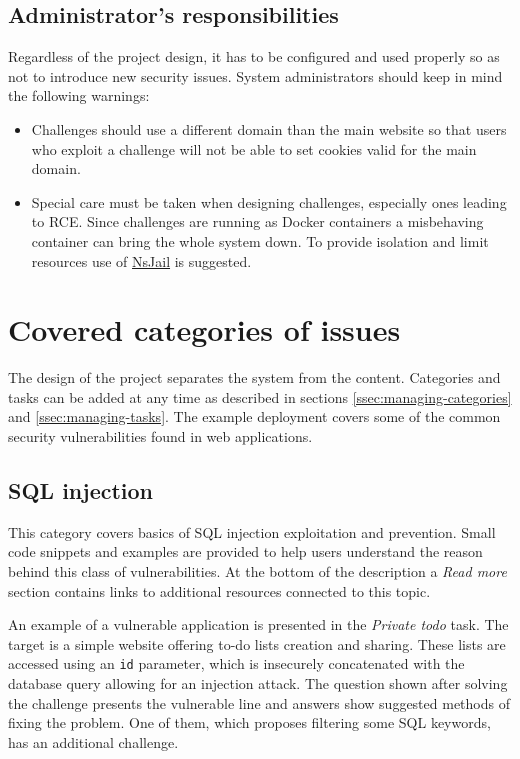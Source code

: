 \subsection{Administrator's responsibilities}

Regardless of the project design, it has to be configured and used properly so as not to introduce new security issues. System administrators should keep in mind the following warnings:

\begin{itemize}
    \item Challenges should use a different domain than the main website so that users who exploit a challenge will not be able to set cookies valid for the main domain.
    \item Special care must be taken when designing challenges, especially ones leading to RCE. Since challenges are running as Docker containers a misbehaving container can bring the whole system down. To provide isolation and limit resources use of \href{https://github.com/google/nsjail}{NsJail} is suggested.
\end{itemize}

\section{Covered categories of issues}

The design of the project separates the system from the content. Categories and tasks can be added at any time as described in sections \ref{ssec:managing-categories} and \ref{ssec:managing-tasks}. The example deployment covers some of the common security vulnerabilities found in web applications.

\subsection{SQL injection}

This category covers basics of SQL injection exploitation and prevention. Small code snippets and examples are provided to help users understand the reason behind this class of vulnerabilities. At the bottom of the description a \textit{Read more} section contains links to additional resources connected to this topic.

An example of a vulnerable application is presented in the \textit{Private todo} task. The target is a simple website offering to-do lists creation and sharing. These lists are accessed using an \texttt{id} parameter, which is insecurely concatenated with the database query allowing for an injection attack. The question shown after solving the challenge presents the vulnerable line and answers show suggested methods of fixing the problem. One of them, which proposes filtering some SQL keywords, has an additional challenge.

